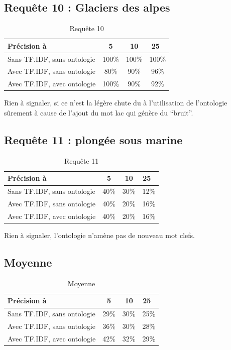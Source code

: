 \documentclass{article}
\begin{document}
\subsection{Requête 10 : \og Glaciers des alpes \fg }

\begin{table}[h!!]
    \centering
    \caption{Requête 10}
\begin{tabular}{|l|c|c|c|}
    \hline
    Précision à & 5 & 10 & 25 \\
    \hline
    Sans TF.IDF, sans ontologie & 100\% & 100\% & 100\% \\
    \hline
    Avec TF.IDF, sans ontologie & 80\% & 90\% & 96\% \\
    \hline
    Avec TF.IDF, avec ontologie & 100\% & 90\% & 92\% \\
    \hline
\end{tabular}
\end{table}

Rien à signaler, si ce n’est la légère chute du à l’utilisation de l’ontologie
sûrement à cause de l’ajout du mot lac qui génère du “bruit”.

\subsection{Requête 11 : \og plongée sous marine \fg }

\begin{table}[h!!]
    \centering
    \caption{Requête 11}
\begin{tabular}{|l|c|c|c|}
    \hline
    Précision à & 5 & 10 & 25 \\
    \hline
    Sans TF.IDF, sans ontologie & 40\% & 30\% & 12\% \\
    \hline
    Avec TF.IDF, sans ontologie & 40\% & 20\% & 16\% \\
    \hline
    Avec TF.IDF, avec ontologie & 40\% & 20\% & 16\% \\
    \hline
\end{tabular}
\end{table}

Rien à signaler, l’ontologie n’amène pas de nouveau mot clefs.

\subsection{Moyenne}

\begin{table}[h!!]
    \centering
    \caption{Moyenne}
\begin{tabular}{|l|c|c|c|}
    \hline
    Précision à & 5 & 10 & 25 \\
    \hline
    Sans TF.IDF, sans ontologie & 29\% &   30\% &  25\% \\
    \hline
    Avec TF.IDF, sans ontologie & 36\% &   30\% &  28\% \\
    \hline
    Avec TF.IDF, avec ontologie & 42\% &   32\% &  29\% \\
    \hline
\end{tabular}
\end{table}
\end{document}
